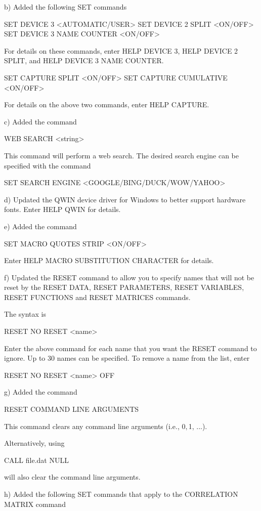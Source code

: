     b) Added the following SET commands

          SET DEVICE 3 <AUTOMATIC/USER>
          SET DEVICE 2 SPLIT <ON/OFF>
          SET DEVICE 3 NAME COUNTER <ON/OFF>

       For details on these commands, enter HELP DEVICE 3,
       HELP DEVICE 2 SPLIT, and HELP DEVICE 3 NAME COUNTER.

          SET CAPTURE SPLIT <ON/OFF>
          SET CAPTURE CUMULATIVE <ON/OFF>

       For details on the above two commands, enter HELP CAPTURE.

    c) Added the command

          WEB SEARCH <string>

       This command will perform a web search.  The desired search
       engine can be specified with the command

          SET SEARCH ENGINE <GOOGLE/BING/DUCK/WOW/YAHOO>

   d) Updated the QWIN device driver for Windows to better support
      hardware fonts.  Enter HELP QWIN for details.

   e) Added the command

          SET MACRO QUOTES STRIP <ON/OFF>

      Enter HELP MACRO SUBSTITUTION CHARACTER for details.

   f) Updated the RESET command to allow you to specify names
      that will not be reset by the RESET DATA, RESET PARAMETERS,
      RESET VARIABLES, RESET FUNCTIONS and RESET MATRICES commands.

      The syntax is

         RESET NO RESET <name>

      Enter the above command for each name that you want the
      RESET command to ignore.  Up to 30 names can be specified.
      To remove a name from the list, enter

         RESET NO RESET <name> OFF

  g) Added the command

         RESET COMMAND LINE ARGUMENTS

     This command clears any command line arguments (i.e., $0, $1, ...).

     Alternatively, using

         CALL file.dat  NULL

     will also clear the command line arguments.

  h) Added the following SET commands that apply to the CORRELATION MATRIX
     command

